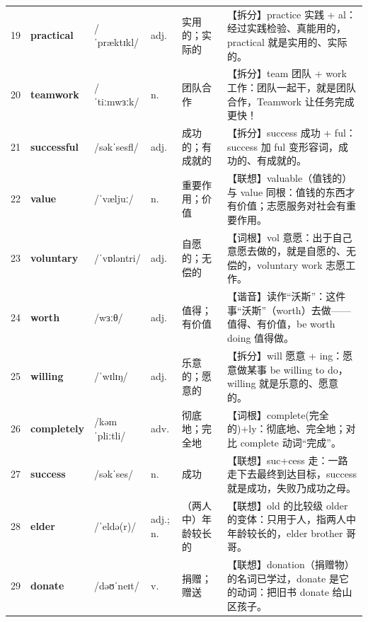 \documentclass[UTF8,a4paper,11pt,oneside]{ctexbook}
\newcommand{\cellword}[1]{{\bfseries\textcolor{wordcol}{#1}}}
\newcommand{\cellipa}[1]{{\footnotesize\textcolor{ipacol}{#1}}}
\newcommand{\cellpos}[1]{\textcolor{poscol}{#1}}
\newcommand{\cellno}[1]{\textcolor{volcolor!75!black}{#1}}
\begin{document}
{\begin{longtable}{@{}C{0.045\textwidth}L{0.155\textwidth}L{0.175\textwidth}C{0.070\textwidth}L{0.180\textwidth}L{0.282\textwidth}@{}}
 \cellno{19} & \cellword{practical} & \cellipa{/ˈpræktɪkl/} & \cellpos{adj.} & 实用的；实际的 & \textcolor{tagSplit}{【拆分】}practice 实践 + al：经过实践检验、真能用的，practical 就是实用的、实际的。 \\
\cellno{20} & \cellword{teamwork} & \cellipa{/ˈtiːmwɜːk/} & \cellpos{n.} & 团队合作 & \textcolor{tagSplit}{【拆分】}team 团队 + work 工作：团队一起干，就是团队合作，Teamwork 让任务完成更快！ \\
 \cellno{21} & \cellword{successful} & \cellipa{/səkˈsesfl/} & \cellpos{adj.} & 成功的；有成就的 & \textcolor{tagSplit}{【拆分】}success 成功 + ful：success 加 ful 变形容词，成功的、有成就的。 \\
\cellno{22} & \cellword{value} & \cellipa{/ˈvæljuː/} & \cellpos{n.} & 重要作用；价值 & \textcolor{tagAssoc}{【联想】}valuable（值钱的）与 value 同根：值钱的东西才有价值；志愿服务对社会有重要作用。 \\
 \cellno{23} & \cellword{voluntary} & \cellipa{/ˈvɒləntri/} & \cellpos{adj.} & 自愿的；无偿的 & \textcolor{tagRoot}{【词根】}vol 意愿：出于自己意愿去做的，就是自愿的、无偿的，voluntary work 志愿工作。 \\
\cellno{24} & \cellword{worth} & \cellipa{/wɜːθ/} & \cellpos{adj.} & 值得；有价值 & \textcolor{tagSound}{【谐音】}读作“沃斯”：这件事“沃斯”（worth）去做——值得、有价值，be worth doing 值得做。 \\
 \cellno{25} & \cellword{willing} & \cellipa{/ˈwɪlɪŋ/} & \cellpos{adj.} & 乐意的；愿意的 & \textcolor{tagSplit}{【拆分】}will 愿意 + ing：愿意做某事 be willing to do，willing 就是乐意的、愿意的。 \\
\cellno{26} & \cellword{completely} & \cellipa{/kəmˈpliːtli/} & \cellpos{adv.} & 彻底地；完全地 & \textcolor{tagRoot}{【词根】}complete(完全的)+ly：彻底地、完全地；对比 complete 动词“完成”。 \\
 \cellno{27} & \cellword{success} & \cellipa{/səkˈses/} & \cellpos{n.} & 成功 & \textcolor{tagAssoc}{【联想】}suc+cess 走：一路走下去最终到达目标，success 就是成功，失败乃成功之母。 \\
\cellno{28} & \cellword{elder} & \cellipa{/ˈeldə(r)/} & \cellpos{adj.;\allowbreak{} n.} & （两人中）年龄较长的 & \textcolor{tagAssoc}{【联想】}old 的比较级 older 的变体：只用于人，指两人中年龄较长的，elder brother 哥哥。 \\
 \cellno{29} & \cellword{donate} & \cellipa{/dəʊˈneɪt/} & \cellpos{v.} & 捐赠；赠送 & \textcolor{tagAssoc}{【联想】}donation（捐赠物）的名词已学过，donate 是它的动词：把旧书 donate 给山区孩子。 \\

\end{longtable}}
\end{document}
